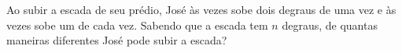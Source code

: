 

     
      









\begin{exemplo} Ao subir a escada de seu prédio, José às vezes sobe dois degraus de uma vez e às vezes sobe um de cada vez. Sabendo que a escada tem $n$ degraus, de quantas maneiras diferentes José pode subir a escada? 

\end{exemplo}

